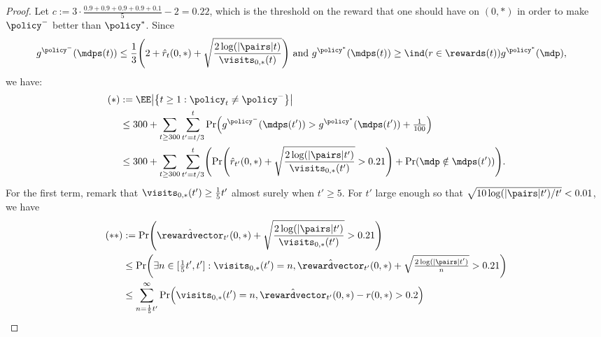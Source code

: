 \documentclass[preprint,cleveref,12pt]{colt2025}
\DeclarePairedDelimiter{\braces}{\{}{\}}	%
\DeclarePairedDelimiter{\parens}{(}{)}	%
\DeclarePairedDelimiter{\abs}{\lvert}{\rvert}	%
\newcommand{\indic}[1]{\ind\parens{#1}}
\def\indicator{\indic}
\def\model{\mdp}
\def\models{\mdps}
\def\reward{\rewardvector}
\begin{document}
\begin{proof}
        Let $c := 3 \cdot \frac{0.9+0.9+0.9+0.9+0.1}{5} - 2 = 0.22$, which is the threshold on the reward that one should have on $(0, *)$ in order to make $\policy^-$ better than $\policy^*$. 
        Since
        \begin{align*}
            g^{\policy^-}(\models(t))
            & \le 
            \frac 13\parens*{
                2 + \hat r_t(0, *) + \sqrt{\frac{2\log(\abs{\pairs}t)}{\visits_{0, *}(t)}}
            }
            \text{~and~}
            g^{\policy^*}(\models(t)) \ge \indicator{r \in \rewards(t)} g^{\policy^*}(\model),
        \end{align*}
        we have:
        \begin{align}
            \nonumber
            (*) & :=
            \EE \abs*{\braces*{
                t \ge 1: \policy_t \ne \policy^{-}
            }}
            \\
            \nonumber
            & \le 300 + 
            \sum_{t \ge 300}
            \sum_{t'=t/3}^t
            \Pr \parens*{
                g^{\policy^-}(\models({t'})) > g^{\policy^*}(\models(t')) + \tfrac 1{100}
            }
            \\
            & 
            \label{appendix:equation:toto24}
            \le 300 + 
            \sum_{t\ge 300}
            \sum_{t' = t/3}^t
            \parens*{
                \Pr \parens*{
                    \hat r_{t'}(0, *) + \sqrt{\frac{2\log(\abs{\pairs}t')}{\visits_{0, *}(t')}} > 0.21
                }
                + 
                \Pr \parens*{
                    \model \notin \models(t')
                }
            }.
        \end{align}
        For the first term, remark that $\visits_{0, *}(t') \ge \frac 15t'$ almost surely when $t' \ge 5$. 
        For $t'$ large enough so that $\sqrt{10\log(\abs{\pairs}t')/t'} < 0.01$, we have
        \begin{align*}
            (**)
            & :=
            \Pr \parens*{
                \hat{\reward}_{t'}(0, *) + \sqrt{\frac{2\log(\abs{\pairs}t')}{\visits_{0, *}(t')}} > 0.21
            } 
            \\
            & \le 
            \Pr \parens*{
                \exists n \in [\tfrac 15t', t']:
                \visits_{0, *}(t') = n, \hat{\reward}_{t'}(0, *) + \sqrt{\tfrac{2\log(\abs{\pairs}t')}{n}} > 0.21
            }
            \\
            & \le 
            \sum_{n=\frac15t'}^\infty
            \Pr\parens*{
                \visits_{0, *}(t') = n, \hat{\reward}_{t'}(0, *) - r(0, *) > 0.2
}
\end{align*}
\end{proof}
\end{document}
